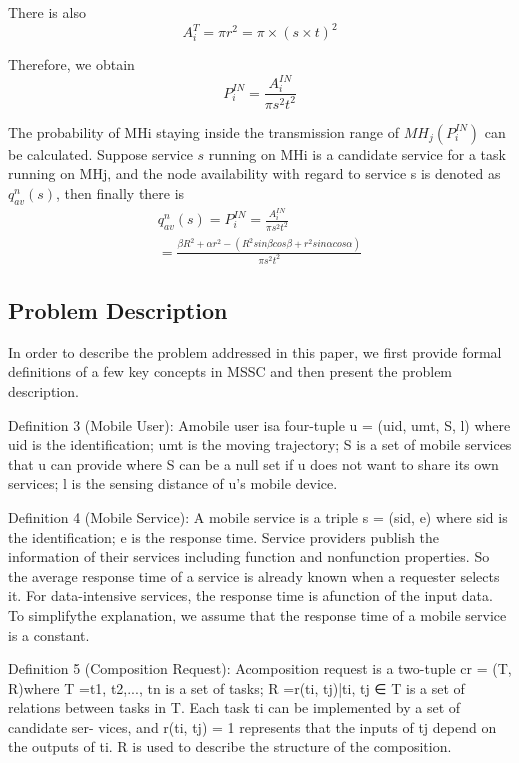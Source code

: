 \documentclass[10pt,journal,compsoc]{IEEEtran}
\begin{document}
There is also
\begin{equation}
A_i^T = \pi r^2 = \pi \times (s \times t)^2
\end{equation}

Therefore, we obtain
\begin{equation}
P_i^{IN} = \frac{A_i^{IN}}{\pi s^2 t^2}
\end{equation}

The probability of MHi staying inside the transmission range of $MH_j (P^{IN}_i)$ can be calculated. Suppose service $s$ running on MHi is a candidate service for a task running on MHj, and the node availability with regard to service s is denoted as $q_{av}^n(s)$, then finally there is
\begin{eqnarray}
q_{av}^n(s) = P^{IN}_i = \frac{A_i^{IN}}{\pi s^2 t^2}\\\nonumber
= \frac{\beta R^2 + \alpha r^2 - (R^2 sin\beta cos\beta + r^2 sin\alpha cos\alpha)}{\pi s^2 t^2}
\end{eqnarray}

\subsection{Problem Description}
In order to describe the problem addressed in this paper, we first provide formal definitions of a few key concepts in MSSC and then present the problem description.

Definition 3 (Mobile User): Amobile user isa four-tuple
u = (uid, umt, S, l) where uid is the identification;
umt is the moving trajectory;
S   is a set of mobile services that u can provide where S can be a null set if u does not want to share its own services;
l   is the sensing distance of u’s mobile device.


Definition 4 (Mobile Service): A mobile service is a triple
s = (sid, e) where sid is the identification;
e is the response time.
Service providers publish the information of their services including function and nonfunction properties. So the average response time of a service is already known when a requester selects it. For data-intensive services, the response time is afunction of the input data. To simplifythe explanation, we assume that the response time of a mobile service is a constant.

Definition 5 (Composition Request): Acomposition request
is a two-tuple cr = (T, R)where T ={t1, t2,..., tn}
is a set of tasks;
R ={r(ti, tj)|ti, tj ∈ T} is a set of relations between tasks in T.
Each task ti can be implemented by a set of candidate ser-
vices, and r(ti, tj) = 1 represents that the inputs of tj depend on the outputs of ti. R is used to describe the structure of the
composition.
\end{document}
